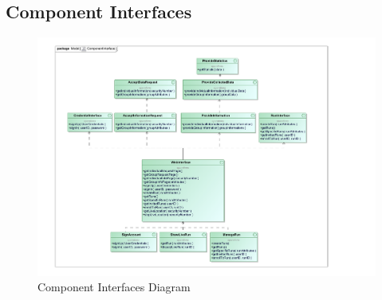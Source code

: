\subsection{Component Interfaces}
\begin{figure}[H]
\centering
\includegraphics[scale=0.8, angle=0,origin=c]{Images/ComponentInterface.pdf}
\caption{Component Interfaces Diagram}
\end{figure}
